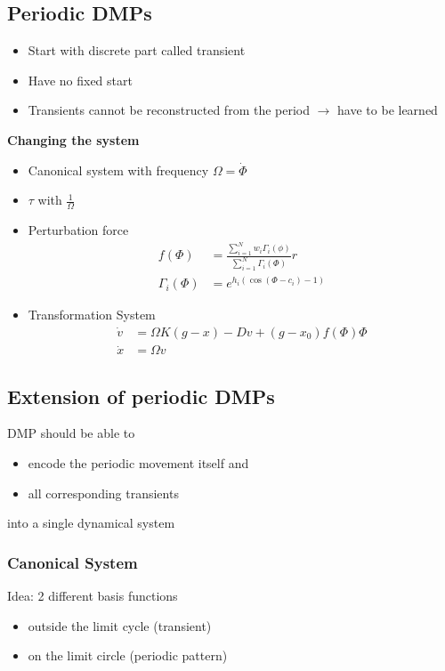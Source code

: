 \subsection{Periodic DMPs}%
\label{ar:sub:periodic_dmps}
\begin{itemize}
\item Start with discrete part called transient
\item Have no fixed start
\item Transients cannot be reconstructed from the period \(\rightarrow\) have to be learned
\end{itemize}

\textbf{Changing the system}
\begin{itemize}
\item Canonical system with frequency \(\Omega = \dot{\Phi}\) 
\item \(\tau\) with \(\frac{1}{\Omega}\)
\item Perturbation force
  \begin{align*}
    f(\Phi) &= \frac{\sum_{i=1}^N w_i \Gamma_i (\phi)}{\sum_{i=1}^N \Gamma_i (\Phi)}r\\
    \Gamma_i (\Phi) &= e^{h_i (\cos(\Phi - c_i) - 1)}
  \end{align*}
\item Transformation System
  \begin{align*}
    \dot{v} &= \Omega K(g - x) - Dv + (g - x_0)f(\Phi)\Phi\\
    \dot{x} &= \Omega v
  \end{align*}
\end{itemize}

\subsection{Extension of periodic DMPs}%
\label{ar:sub:extension_of_periodic_dmps}
DMP should be able to
\begin{itemize}
\item encode the periodic movement itself and
\item all corresponding transients
\end{itemize}
into a single dynamical system\\

\subsubsection{Canonical System}%
\label{ar:ssub:canoncial_system}
Idea: 2 different basis functions
\begin{itemize}
\item outside the limit cycle (transient)
\item on the limit circle (periodic pattern)
\end{itemize}


